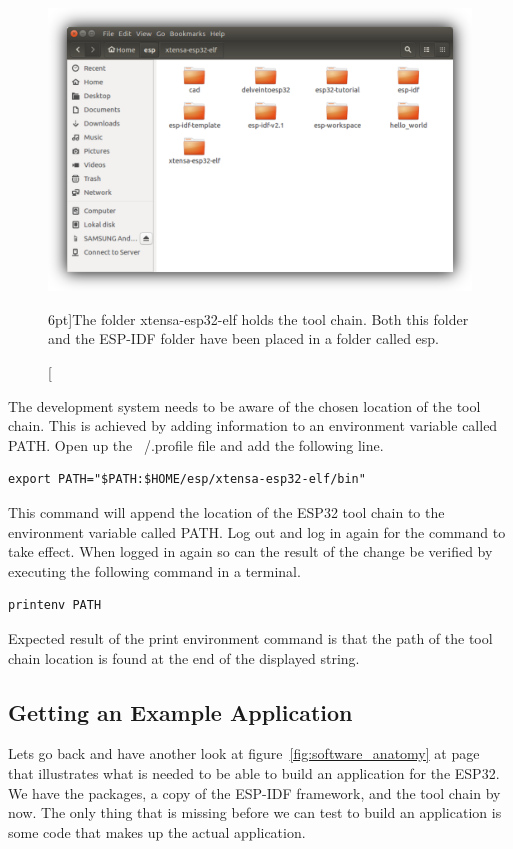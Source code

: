 \documentclass{tufte-book}
\begin{document}
\begin{figure}
	\includegraphics{tool_chain_folder_shadowed.png}
	\caption[ $n$.][6pt]{The folder xtensa-esp32-elf holds the tool chain. Both this folder and the ESP-IDF folder have been placed in a folder called esp.}
	\label{fig:tool_chain_folder_shadowed}
\end{figure}


The development system needs to be aware of the chosen location of the tool chain. This is achieved by adding information to an environment variable called PATH. Open up the ~/.profile file and add the following line.

\begin{lstlisting}
export PATH="$PATH:$HOME/esp/xtensa-esp32-elf/bin"
\end{lstlisting}

This command will append the location of the ESP32 tool chain to the environment variable called PATH. Log out and log in again for the command to take effect. When logged in again so can the result of the change be verified by executing the following command in a terminal.

\begin{lstlisting}
printenv PATH
\end{lstlisting}

Expected result of the print environment command is that the path of the tool chain location is found at the end of the displayed string.

\subsection{Getting an Example Application}
Lets go back and have another look at figure~\ref{fig:software_anatomy} at page~\pageref{fig:software_anatomy} that illustrates what is needed to be able to build an application for the ESP32. We have the packages, a copy of the ESP-IDF framework, and the tool chain by now. The only thing that is missing before we can test to build an application is some code that makes up the actual application.
\end{document}
